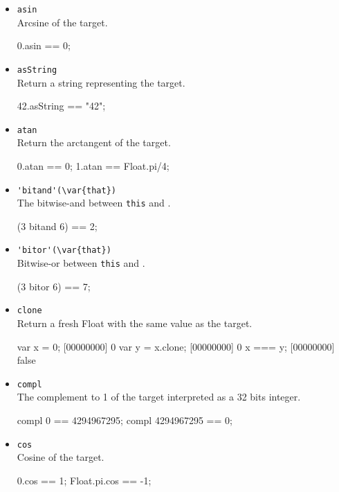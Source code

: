 \begin{itemize}
\item \lstinline|asin|\\
  Arcsine of the target.
\begin{urbiassert}
0.asin == 0;
\end{urbiassert}

\item \lstinline|asString|\\
  Return a string representing the target.
\begin{urbiassert}
42.asString == "42";
\end{urbiassert}

\item \lstinline|atan|\\
  Return the arctangent of the target.
\begin{urbiassert}
0.atan == 0;
1.atan == Float.pi/4;
\end{urbiassert}

\item \lstinline|'bitand'(\var{that})|\\
  The bitwise-and between \lstinline|this| and .
\begin{urbiassert}
(3 bitand 6) == 2;
\end{urbiassert}

\item \lstinline|'bitor'(\var{that})|\\
  Bitwise-or between \lstinline|this| and .
\begin{urbiassert}
(3 bitor 6) == 7;
\end{urbiassert}

\item \lstinline|clone|\\
  Return a fresh Float with the same value as the target.
\begin{urbiscript}
var x = 0;
[00000000] 0
var y = x.clone;
[00000000] 0
x === y;
[00000000] false
\end{urbiscript}

\item \lstinline|compl|\\
  The complement to 1 of the target interpreted as a 32 bits integer.
\begin{urbiassert}
compl 0 == 4294967295;
compl 4294967295 == 0;
\end{urbiassert}

\item \lstinline|cos|\\
  Cosine of the target.
\begin{urbiassert}
0.cos == 1;
Float.pi.cos == -1;
\end{urbiassert}


\end{itemize}
